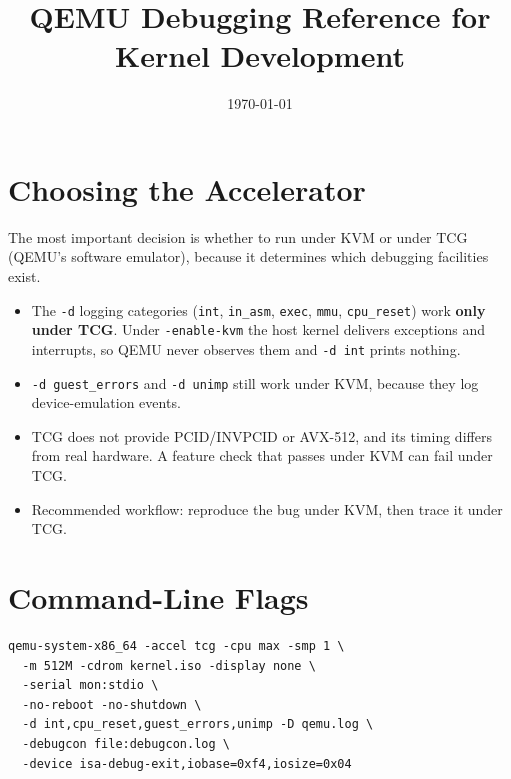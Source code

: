 \documentclass[11pt,a4paper]{article}
\title{QEMU Debugging Reference for Kernel Development}
\author{}
\date{\today}
\newcommand{\cmd}[1]{\texttt{#1}}
\begin{document}
\maketitle
\tableofcontents
\bigskip

\section{Choosing the Accelerator}
The most important decision is whether to run under KVM or under TCG
(QEMU's software emulator), because it determines which debugging
facilities exist.
\begin{itemize}
  \item The \cmd{-d} logging categories (\cmd{int}, \cmd{in\_asm},
        \cmd{exec}, \cmd{mmu}, \cmd{cpu\_reset}) work \textbf{only under TCG}.
        Under \cmd{-enable-kvm} the host kernel delivers exceptions and
        interrupts, so QEMU never observes them and \cmd{-d int} prints nothing.
  \item \cmd{-d guest\_errors} and \cmd{-d unimp} still work under KVM,
        because they log device-emulation events.
  \item TCG does not provide PCID/INVPCID or AVX-512, and its timing differs
        from real hardware. A feature check that passes under KVM can fail under TCG.
  \item Recommended workflow: reproduce the bug under KVM, then trace it under TCG.
\end{itemize}
\section{Command-Line Flags}
\begin{lstlisting}
qemu-system-x86_64 -accel tcg -cpu max -smp 1 \
  -m 512M -cdrom kernel.iso -display none \
  -serial mon:stdio \
  -no-reboot -no-shutdown \
  -d int,cpu_reset,guest_errors,unimp -D qemu.log \
  -debugcon file:debugcon.log \
  -device isa-debug-exit,iobase=0xf4,iosize=0x04
\end{lstlisting}
\end{document}
